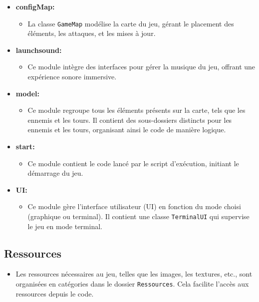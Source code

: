 \documentclass{article}
\begin{document}
\begin{itemize}
    \item \textbf{configMap:}
    \begin{itemize}
        \item La classe \texttt{GameMap} modélise la carte du jeu, gérant le placement des éléments, les attaques, et les mises à jour.
    \end{itemize}
    
    \item \textbf{launchsound:}
    \begin{itemize}
        \item Ce module intègre des interfaces pour gérer la musique du jeu, offrant une expérience sonore immersive.
    \end{itemize}

    \item \textbf{model:}
    \begin{itemize}
        \item Ce module regroupe tous les éléments présents sur la carte, tels que les ennemis et les tours. Il contient des sous-dossiers distincts pour les ennemis et les tours, organisant ainsi le code de manière logique.
    \end{itemize}

    \item \textbf{start:}
    \begin{itemize}
        \item Ce module contient le code lancé par le script d'exécution, initiant le démarrage du jeu.
    \end{itemize}

    \item \textbf{UI:}
    \begin{itemize}
        \item Ce module gère l'interface utilisateur (UI) en fonction du mode choisi (graphique ou terminal). Il contient une classe \texttt{TerminalUI} qui supervise le jeu en mode terminal.
    \end{itemize}
\end{itemize}

\subsection*{Ressources}

\begin{itemize}
    \item Les ressources nécessaires au jeu, telles que les images, les textures, etc., sont organisées en catégories dans le dossier \texttt{Ressources}. Cela facilite l'accès aux ressources depuis le code.
\end{itemize}
\end{document}
